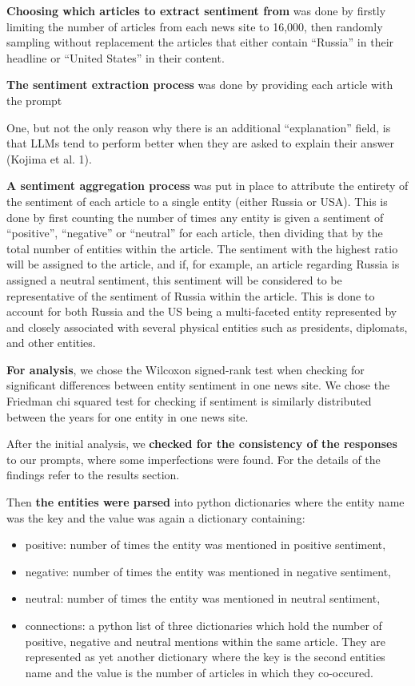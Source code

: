 \documentclass{IEEEtran}
\begin{document}
\textbf{Choosing which articles to extract sentiment from} was done by firstly limiting the number of articles from each news site to 16,000, then randomly sampling without replacement the articles that either contain “Russia” in their headline or “United States” in their content.

\textbf{The sentiment extraction process} was done by providing each article with the prompt



One, but not the only reason why there is an additional “explanation” field, is that LLMs tend to perform better when they are asked to explain their answer (Kojima et al. 1).\newline

\textbf{A sentiment aggregation process} was put in place to attribute the entirety of the sentiment of each article to a single entity (either Russia or USA). This is done by first counting the number of times any entity is given a sentiment of “positive”, “negative” or “neutral” for each article, then dividing that by the total number of entities within the article. The sentiment with the highest ratio will be assigned to the article, and if, for example, an article regarding Russia is assigned a neutral sentiment, this sentiment will be considered to be representative of the sentiment of Russia within the article. This is done to account for both Russia and the US being a multi-faceted entity represented by and closely associated with several physical entities such as presidents, diplomats, and other entities.

\textbf{For analysis}, we chose the Wilcoxon signed-rank test when checking for significant differences between entity sentiment in one news site. We chose the Friedman chi squared test for checking if sentiment is similarly distributed between the years for one entity in one news site.

After the initial analysis, we \textbf{checked for the consistency of the responses} to our prompts, where some imperfections were found. For the details of the findings refer to the results section.

Then \textbf{the entities were parsed} into python dictionaries where the entity name was the key and the value was again a dictionary containing:
\begin{itemize}
    \item positive: number of times the entity was mentioned in positive sentiment,
    \item negative: number of times the entity was mentioned in negative sentiment,
    \item neutral: number of times the entity was mentioned in neutral sentiment,
    \item connections: a python list of three dictionaries which hold the number of positive, negative and neutral mentions within the same article. They are represented as yet another dictionary where the key is the second entities name and the value is the number of articles in which they co-occured.
\end{itemize}
\end{document}
